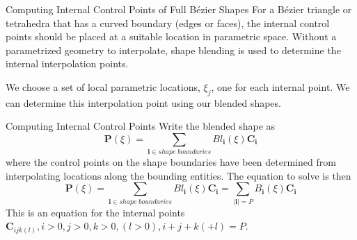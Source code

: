 \documentclass[12pt]{beamer}
\newcommand{\spa}{\vspace{0.5cm}\newline}
\begin{document}
\begin{frame}{Computing Internal Control Points of Full B{\'e}zier Shapes}
For a B{\'e}zier triangle or tetrahedra that has a curved boundary (edges or faces), the internal control points should be placed at a suitable location in parametric space. Without a parametrized geometry to interpolate, shape blending is used to determine the internal interpolation points. \spa


We choose a set of local parametric locations, $\xi_j$, one for each internal point. We can determine this interpolation point using our blended shapes. 
\end{frame}
\begin{frame}{Computing Internal Control Points}
Write the blended shape as 
\[\mathbf{P}(\xi) = \displaystyle \sum_{\mathbf{i} \in shape\;boundaries}Bl_{\mathbf{i}}(\xi)\mathbf{C}_\mathbf{i}\] 
where the control points on the shape boundaries have been determined from interpolating locations along the bounding entities. The equation to solve is then
\[ \mathbf{P}(\xi) = \displaystyle \sum_{\mathbf{i} \in shape\;boundaries}Bl_{\mathbf{i}}(\xi)\mathbf{C}_\mathbf{i} = \displaystyle \sum_{|{\mathbf{i}| = P}} B_\mathbf{i}(\xi)\mathbf{C}_{\mathbf{i}} \]
This is an equation for the internal points $\mathbf{C}_{ijk(l)}, i > 0, j>0, k>0, (l > 0), i+j+k(+l) = P$.
\end{frame}
\end{document}
